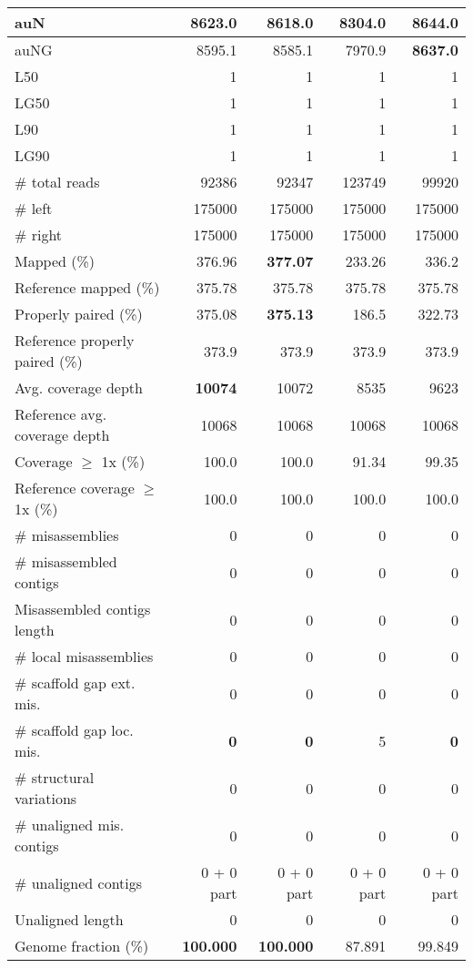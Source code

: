 \documentclass[12pt,a4paper]{article}
\begin{document}
\begin{table}[ht]
\begin{center}
\begin{tabular}{|l*{4}{|r}|}
auN & 8623.0 & 8618.0 & 8304.0 & {\bf 8644.0} \\ \hline
auNG & 8595.1 & 8585.1 & 7970.9 & {\bf 8637.0} \\ \hline
L50 & 1 & 1 & 1 & 1 \\ \hline
LG50 & 1 & 1 & 1 & 1 \\ \hline
L90 & 1 & 1 & 1 & 1 \\ \hline
LG90 & 1 & 1 & 1 & 1 \\ \hline
\# total reads & 92386 & 92347 & 123749 & 99920 \\ \hline
\# left & 175000 & 175000 & 175000 & 175000 \\ \hline
\# right & 175000 & 175000 & 175000 & 175000 \\ \hline
Mapped (\%) & 376.96 & {\bf 377.07} & 233.26 & 336.2 \\ \hline
Reference mapped (\%) & 375.78 & 375.78 & 375.78 & 375.78 \\ \hline
Properly paired (\%) & 375.08 & {\bf 375.13} & 186.5 & 322.73 \\ \hline
Reference properly paired (\%) & 373.9 & 373.9 & 373.9 & 373.9 \\ \hline
Avg. coverage depth & {\bf 10074} & 10072 & 8535 & 9623 \\ \hline
Reference avg. coverage depth & 10068 & 10068 & 10068 & 10068 \\ \hline
Coverage $\geq$ 1x (\%) & 100.0 & 100.0 & 91.34 & 99.35 \\ \hline
Reference coverage $\geq$ 1x (\%) & 100.0 & 100.0 & 100.0 & 100.0 \\ \hline
\# misassemblies & 0 & 0 & 0 & 0 \\ \hline
\# misassembled contigs & 0 & 0 & 0 & 0 \\ \hline
Misassembled contigs length & 0 & 0 & 0 & 0 \\ \hline
\# local misassemblies & 0 & 0 & 0 & 0 \\ \hline
\# scaffold gap ext. mis. & 0 & 0 & 0 & 0 \\ \hline
\# scaffold gap loc. mis. & {\bf 0} & {\bf 0} & 5 & {\bf 0} \\ \hline
\# structural variations & 0 & 0 & 0 & 0 \\ \hline
\# unaligned mis. contigs & 0 & 0 & 0 & 0 \\ \hline
\# unaligned contigs & 0 + 0 part & 0 + 0 part & 0 + 0 part & 0 + 0 part \\ \hline
Unaligned length & 0 & 0 & 0 & 0 \\ \hline
Genome fraction (\%) & {\bf 100.000} & {\bf 100.000} & 87.891 & 99.849 \\ \hline

\end{tabular}
\end{center}
\end{table}
\end{document}
